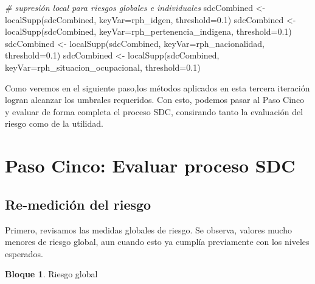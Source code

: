 \documentclass[
]{book}
\newenvironment{Shaded}{\begin{snugshade}}{\end{snugshade}}
\newcommand{\AttributeTok}[1]{\textcolor[rgb]{0.77,0.63,0.00}{#1}}
\newcommand{\CommentTok}[1]{\textcolor[rgb]{0.56,0.35,0.01}{\textit{#1}}}
\newcommand{\FloatTok}[1]{\textcolor[rgb]{0.00,0.00,0.81}{#1}}
\newcommand{\FunctionTok}[1]{\textcolor[rgb]{0.00,0.00,0.00}{#1}}
\newcommand{\NormalTok}[1]{#1}
\newcommand{\OtherTok}[1]{\textcolor[rgb]{0.56,0.35,0.01}{#1}}
\newcommand{\StringTok}[1]{\textcolor[rgb]{0.31,0.60,0.02}{#1}}
\theoremstyle{definition}
\theoremstyle{definition}
\newtheorem{example}{Bloque}[chapter]
\theoremstyle{definition}
\theoremstyle{definition}
\theoremstyle{remark}
\begin{document}
\begin{Shaded}
\begin{Highlighting}[]
\CommentTok{\# supresión local para riesgos globales e individuales}
\NormalTok{sdcCombined }\OtherTok{\textless{}{-}} \FunctionTok{localSupp}\NormalTok{(sdcCombined, }\AttributeTok{keyVar=}\StringTok{\textquotesingle{}rph\_idgen\textquotesingle{}}\NormalTok{, }\AttributeTok{threshold=}\FloatTok{0.1}\NormalTok{)}
\NormalTok{sdcCombined }\OtherTok{\textless{}{-}} \FunctionTok{localSupp}\NormalTok{(sdcCombined, }\AttributeTok{keyVar=}\StringTok{\textquotesingle{}rph\_pertenencia\_indigena\textquotesingle{}}\NormalTok{, }\AttributeTok{threshold=}\FloatTok{0.1}\NormalTok{)}
\NormalTok{sdcCombined }\OtherTok{\textless{}{-}} \FunctionTok{localSupp}\NormalTok{(sdcCombined, }\AttributeTok{keyVar=}\StringTok{\textquotesingle{}rph\_nacionalidad\textquotesingle{}}\NormalTok{, }\AttributeTok{threshold=}\FloatTok{0.1}\NormalTok{)}
\NormalTok{sdcCombined }\OtherTok{\textless{}{-}} \FunctionTok{localSupp}\NormalTok{(sdcCombined, }\AttributeTok{keyVar=}\StringTok{\textquotesingle{}rph\_situacion\_ocupacional\textquotesingle{}}\NormalTok{, }\AttributeTok{threshold=}\FloatTok{0.1}\NormalTok{)}
\end{Highlighting}
\end{Shaded}

Como veremos en el siguiente paso,los métodos aplicados en esta tercera iteración logran alcanzar los umbrales requeridos. Con esto, podemos pasar al Paso Cinco y evaluar de forma completa el proceso SDC, consirando tanto la evaluación del riesgo como de la utilidad.

\hypertarget{paso-cinco-evaluar-proceso-sdc}{%
\section{Paso Cinco: Evaluar proceso SDC}\label{paso-cinco-evaluar-proceso-sdc}}

\hypertarget{re-mediciuxf3n-del-riesgo}{%
\subsection{Re-medición del riesgo}\label{re-mediciuxf3n-del-riesgo}}

Primero, revisamos las medidas globales de riesgo. Se observa, valores mucho menores de riesgo global, aun cuando esto ya cumplía previamente con los niveles esperados.

\begin{example}
\protect\hypertarget{exm:bloque66nbm}{}\label{exm:bloque66nbm}Riesgo global
\end{example}
\end{document}
